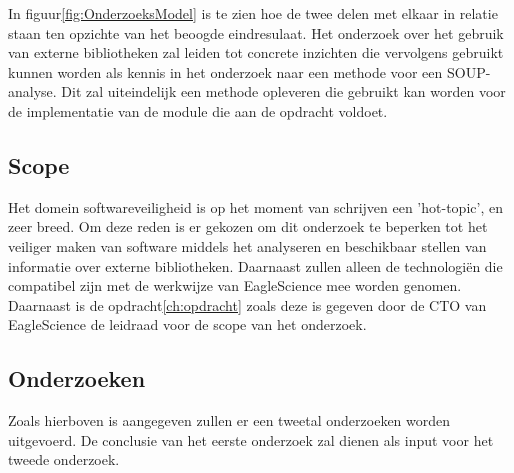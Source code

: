 In figuur\ref{fig:OnderzoeksModel} is te zien hoe de twee delen met elkaar in relatie staan ten opzichte van het beoogde eindresulaat. Het onderzoek over het gebruik van externe bibliotheken zal leiden tot concrete inzichten die vervolgens gebruikt kunnen worden als kennis in het onderzoek naar een methode voor een SOUP-analyse. Dit zal uiteindelijk een methode opleveren die gebruikt kan worden voor de implementatie van de module die aan de opdracht voldoet.

\subsection{Scope}\label{subsec:scope}
Het domein softwareveiligheid is op het moment van schrijven een 'hot-topic', en zeer breed. Om deze reden is er gekozen om dit onderzoek te beperken tot het veiliger maken van software middels het analyseren en beschikbaar stellen van informatie over externe bibliotheken. Daarnaast zullen alleen de technologiën die compatibel zijn met de werkwijze van EagleScience mee worden genomen. Daarnaast is de opdracht\ref{ch:opdracht} zoals deze is gegeven door de CTO van EagleScience de leidraad voor de scope van het onderzoek.

\subsection{Onderzoeken}\label{subsubsec:onderzoeken}
Zoals hierboven is aangegeven zullen er een tweetal onderzoeken worden uitgevoerd. De conclusie van het eerste onderzoek zal dienen als input voor het tweede onderzoek.



